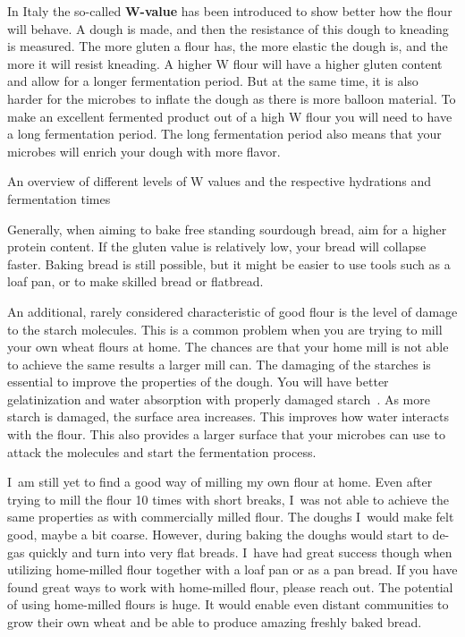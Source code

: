 In Italy the so-called
\textbf{W-value} has been introduced to show better how the flour will behave.
A dough is made, and then the resistance of this dough to kneading is measured.
The more gluten a flour has, the more elastic the dough is, and the more it will
resist kneading. A higher W flour will have a higher gluten content and allow for a longer
fermentation period. But at the same time, it is also harder for the microbes to
inflate the dough as there is more balloon material. To make an excellent fermented
product out of a high W flour you will need to have a long fermentation period.
The long fermentation period also means that your microbes will enrich
your dough with more flavor.

\begin{table}[!htb]
    \begin{center}
        
        \caption{An overview of different levels of W values and the
        respective hydrations and fermentation times}
        \label{tab:w-value}
    \end{center}
\end{table}

Generally, when aiming to
bake free standing sourdough bread, aim for a higher protein content. If the
gluten value is relatively low, your bread will collapse faster. Baking bread
is still possible, but it might be easier to use tools such as a loaf pan, or
to make skilled bread or flatbread.

An additional, rarely considered characteristic of good flour is the level of damage to the
starch molecules. This is a common problem when you are trying to mill your own wheat flours at
home. The chances are that your home mill is not able to achieve the same results
a larger mill can. The damaging of the starches is essential to improve the
properties of the dough. You will have better gelatinization and water
absorption with properly damaged starch~\cite{starch+damage+flour}. As more
starch is damaged, the surface area increases. This improves how water interacts with the flour.
This also provides a larger surface that your microbes can use to attack the molecules
and start the fermentation process.

I~am still
yet to find a good way of milling my own flour at home. Even after trying to
mill the flour 10 times with short breaks, I~was not able to achieve the same
properties as with commercially milled flour. The doughs I~would make felt
good, maybe a bit coarse. However, during baking the doughs would start to
de-gas quickly and turn into very flat breads. I~have had great success though when
utilizing home-milled flour together with a loaf pan or as a pan bread. If you
have found great ways to work with home-milled flour, please reach out. The potential
of using home-milled flours is huge. It would enable even distant communities
to grow their own wheat and be able to produce amazing freshly baked bread.
